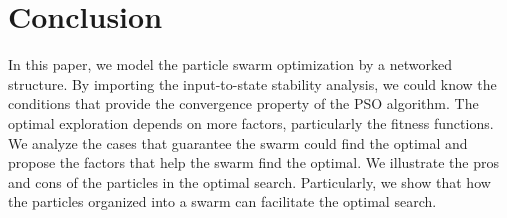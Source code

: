 \section{Conclusion}
\label{sec:conclusion}

In this paper, we model the particle swarm optimization by a networked structure.
By importing the input-to-state stability analysis, we could know the conditions that provide the convergence property of the PSO algorithm.
The optimal exploration depends on more factors, particularly the fitness functions.
We analyze the cases that guarantee the swarm could find the optimal and propose the factors that help the swarm find the optimal.
We illustrate the pros and cons of the particles in the optimal search. 
Particularly, we show that how the particles organized into a swarm can facilitate the optimal search.
